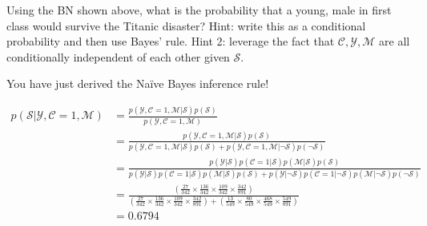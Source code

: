 \documentclass[assignment02_Solutions]{subfiles}
\begin{document}
\begin{exercise}[(45 minutes)]

\bes
\item Using the BN shown above, what is the probability that a young, male in first class would survive the Titanic disaster?  Hint: write this as a conditional probability and then use Bayes' rule.  Hint 2: leverage the fact that $\mathcal{C}, \mathcal{Y}, \mathcal{M}$ are all conditionally independent of each other given $\mathcal{S}$.

You have just derived the Na\"ive Bayes inference rule!

\begin{boxedsolution}
\begin{align}
p(\mathcal{S}|\mathcal{Y}, \mathcal{C}=1, \mathcal{M}) &= \frac{p(\mathcal{Y}, \mathcal{C}=1, \mathcal{M}|\mathcal{S})p(\mathcal{S})}{p(\mathcal{Y}, \mathcal{C}=1, \mathcal{M})} \nonumber \\
&= \frac{p(\mathcal{Y}, \mathcal{C}=1, \mathcal{M}|\mathcal{S})p(\mathcal{S})}{p(\mathcal{Y}, \mathcal{C}=1, \mathcal{M}| \mathcal{S})p(\mathcal{S}) + p(\mathcal{Y}, \mathcal{C}=1, \mathcal{M}|\neg \mathcal{S})p(\neg \mathcal{S})} \nonumber \\
&=  \frac{p(\mathcal{Y}|\mathcal{S}) p( \mathcal{C}=1 | \mathcal{S}) p(\mathcal{M}|\mathcal{S})p(\mathcal{S})}{p(\mathcal{Y}|\mathcal{S}) p( \mathcal{C}=1 | \mathcal{S}) p(\mathcal{M}|\mathcal{S})p(\mathcal{S}) + p(\mathcal{Y}|\neg \mathcal{S}) p( \mathcal{C}=1 | \neg \mathcal{S}) p(\mathcal{M}|\neg \mathcal{S})p(\neg \mathcal{S})} \nonumber \\
&= \frac{\left ( \frac{27}{342} \times \frac{136}{342} \times \frac{109}{342}\times \frac{342}{891}\right)}{\left ( \frac{27}{342} \times \frac{136}{342} \times \frac{109}{342}\times \frac{342}{891} \right ) + \left ( \frac{13}{549} \times \frac{80}{549} \times \frac{468}{549}\times \frac{549}{891} \right )} \nonumber \\
&= 0.6794 \nonumber
\end{align}

\end{boxedsolution}


\end{exercise}
\end{document}
